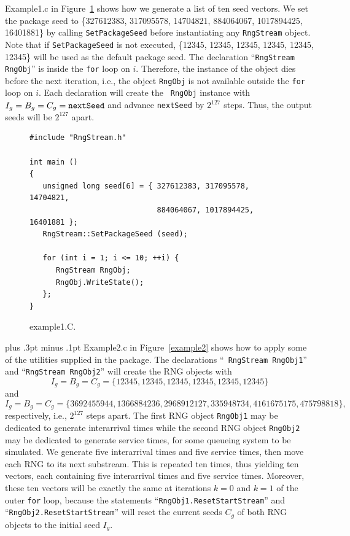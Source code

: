 \documentclass[12pt]{article}
\newcommand{\sesquispace}{\baselineskip 20.40pt plus .3pt minus .1pt}
\begin{document}
Example1.c in Figure~\ref{example1} shows how we generate a list
of ten seed vectors. We
set the package seed to \{327612383, 317095578, 14704821,
 884064067, 1017894425, 16401881\} by calling {\tt SetPackageSeed}
before instantiating any  {\tt RngStream} object. Note that if
 {\tt SetPackageSeed} is not executed, \{12345, 12345, 12345, 12345,
12345, 12345\} will be used as the default package seed. The
declaration ``{\tt RngStream RngObj}'' is inside the {\tt for} loop
on $i$. Therefore, the instance of the object dies before the next
iteration, i.e., the object {\tt RngObj} is not available outside
the {\tt for} loop on $i$. Each declaration will create the {\tt
RngObj} instance with $I_g=B_g=C_g={\tt nextSeed}$ and advance
{\tt nextSeed} by $2^{127}$ steps. Thus, the output seeds will be
$2^{127}$ apart.

\begin{figure}[hbt]
\caption{example1.C.} \label{example1}
\begin{verbatim}
#include "RngStream.h"

int main ()
{
   unsigned long seed[6] = { 327612383, 317095578, 14704821,
                             884064067, 1017894425, 16401881 };
   RngStream::SetPackageSeed (seed);

   for (int i = 1; i <= 10; ++i) {
      RngStream RngObj;
      RngObj.WriteState();
   };
}
\end{verbatim}
\end{figure}

\sesquispace
\hspace{18pt}
Example2.c in Figure~\ref{example2} shows how to apply some of the
utilities supplied in the package. The declarations ``{\tt
RngStream RngObj1}'' and ``{\tt RngStream RngObj2}'' will create the
RNG objects with
$$I_g=B_g=C_g=\{12345, 12345, 12345, 12345,
  12345, 12345\}$$
and
$$I_g=B_g=C_g=\{3692455944, 1366884236,
 2968912127, 335948734, 4161675175, 475798818\},$$
respectively, i.e., $2^{127}$ steps apart.
The first RNG object {\tt RngObj1} may be dedicated to generate
interarrival times while the second RNG object {\tt RngObj2} may
be dedicated to generate service times, for some queueing system
to be simulated.
We generate five interarrival times and five service times,
then move each RNG to its next substream.
This is repeated ten times, thus yielding ten vectors,
each containing five interarrival times and five service times.
Moreover, these ten vectors will be exactly the same at
iterations $k=0$ and $k=1$ of the outer {\tt for} loop,
because the statements ``{\tt RngObj1.ResetStartStream}'' and
``{\tt RngObj2.ResetStartStream}'' will reset the current seeds
$C_g$ of both RNG objects to the initial seed $I_g$.
\end{document}
